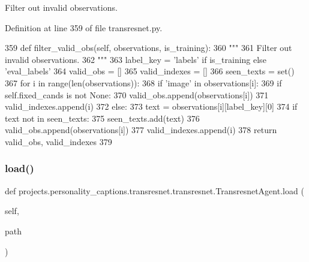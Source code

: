 \begin{DoxyVerb}Filter out invalid observations.
\end{DoxyVerb}
 

Definition at line 359 of file transresnet.\+py.


\begin{DoxyCode}
359     \textcolor{keyword}{def }filter\_valid\_obs(self, observations, is\_training):
360         \textcolor{stringliteral}{"""}
361 \textcolor{stringliteral}{        Filter out invalid observations.}
362 \textcolor{stringliteral}{        """}
363         label\_key = \textcolor{stringliteral}{'labels'} \textcolor{keywordflow}{if} is\_training \textcolor{keywordflow}{else} \textcolor{stringliteral}{'eval\_labels'}
364         valid\_obs = []
365         valid\_indexes = []
366         seen\_texts = set()
367         \textcolor{keywordflow}{for} i \textcolor{keywordflow}{in} range(len(observations)):
368             \textcolor{keywordflow}{if} \textcolor{stringliteral}{'image'} \textcolor{keywordflow}{in} observations[i]:
369                 \textcolor{keywordflow}{if} self.fixed\_cands \textcolor{keywordflow}{is} \textcolor{keywordflow}{not} \textcolor{keywordtype}{None}:
370                     valid\_obs.append(observations[i])
371                     valid\_indexes.append(i)
372                 \textcolor{keywordflow}{else}:
373                     text = observations[i][label\_key][0]
374                     \textcolor{keywordflow}{if} text \textcolor{keywordflow}{not} \textcolor{keywordflow}{in} seen\_texts:
375                         seen\_texts.add(text)
376                         valid\_obs.append(observations[i])
377                         valid\_indexes.append(i)
378         \textcolor{keywordflow}{return} valid\_obs, valid\_indexes
379 
\end{DoxyCode}
\mbox{\label{classprojects_1_1personality__captions_1_1transresnet_1_1transresnet_1_1TransresnetAgent_ae8a9b4cd65c4440314769206a4c821b8}} 
\subsubsection{\texorpdfstring{load()}{load()}}
{\footnotesize\ttfamily def projects.\+personality\+\_\+captions.\+transresnet.\+transresnet.\+Transresnet\+Agent.\+load (\begin{DoxyParamCaption}\item[{}]{self,  }\item[{}]{path }\end{DoxyParamCaption})}

